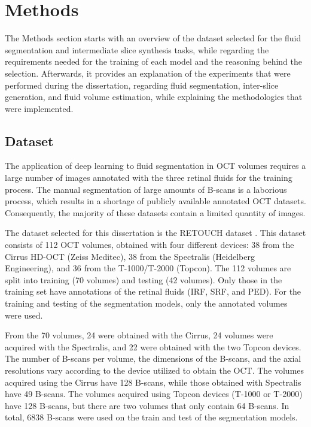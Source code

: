 \chapter{Methods}\label{Methods}
The Methods section starts with an overview of the dataset selected for the fluid segmentation and intermediate slice synthesis tasks, while regarding the requirements needed for the training of each model and the reasoning behind the selection. Afterwards, it provides an explanation of the experiments that were performed during the dissertation, regarding fluid segmentation, inter-slice generation, and fluid volume estimation, while explaining the methodologies that were implemented.

\section{Dataset}
The application of deep learning to fluid segmentation in OCT volumes requires a large number of images annotated with the three retinal fluids for the training process. The manual segmentation of large amounts of B-scans is a laborious process, which results in a shortage of publicly available annotated OCT datasets. Consequently, the majority of these datasets contain a limited quantity of images.
\par
The dataset selected for this dissertation is the RETOUCH dataset \parencite{Bogunovic2019b}. This dataset consists of 112 OCT volumes, obtained with four different devices: 38 from the Cirrus HD-OCT (Zeiss Meditec), 38 from the Spectralis (Heidelberg Engineering), and 36 from the \mbox{T-1000}/T-2000 (Topcon). The 112 volumes are split into training (70 volumes) and testing (42 volumes). Only those in the training set have annotations of the retinal fluids (IRF, SRF, and PED). For the training and testing of the segmentation models, only the annotated volumes were used.
\par
From the 70 volumes, 24 were obtained with the Cirrus, 24 volumes were acquired with the Spectralis, and 22 were obtained with the two Topcon devices. The number of B-scans per volume, the dimensions of the B-scans, and the axial resolutions vary according to the device utilized to obtain the OCT. The volumes acquired using the Cirrus have 128 B-scans, while those obtained with Spectralis have 49 B-scans. The volumes acquired using Topcon devices (\mbox{T-1000} or \mbox{T-2000}) have 128 B-scans, but there are two volumes that only contain 64 \mbox{B-scans}. In total, 6838 B-scans were used on the train and test of the segmentation models.
